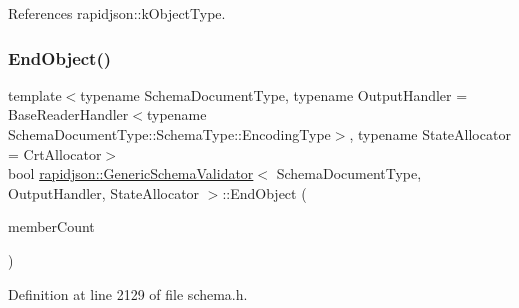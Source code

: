 References rapidjson\+::k\+Object\+Type.

\mbox{\label{classrapidjson_1_1_generic_schema_validator_ae3d4ceb7937a1a6ac3702c29e9243128}} 
\subsubsection{\texorpdfstring{EndObject()}{EndObject()}}
{\footnotesize\ttfamily template$<$typename Schema\+Document\+Type, typename Output\+Handler = Base\+Reader\+Handler$<$typename Schema\+Document\+Type\+::\+Schema\+Type\+::\+Encoding\+Type$>$, typename State\+Allocator = Crt\+Allocator$>$ \\
bool \mbox{\hyperlink{classrapidjson_1_1_generic_schema_validator}{rapidjson\+::\+Generic\+Schema\+Validator}}$<$ Schema\+Document\+Type, Output\+Handler, State\+Allocator $>$\+::End\+Object (\begin{DoxyParamCaption}\item[{\mbox{\hyperlink{namespacerapidjson_a44eb33eaa523e36d466b1ced64b85c84}{Size\+Type}}}]{member\+Count }\end{DoxyParamCaption})}



Definition at line 2129 of file schema.\+h.


